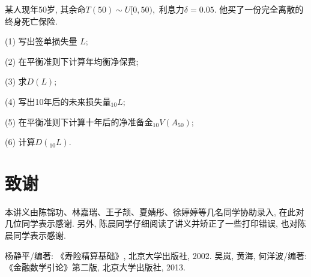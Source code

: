 \documentclass[a4paper,openany, 10pt]{ctexbook}
\newcommand{\hei}{\CJKfamily{hei}}      %
\begin{document}
\begin{exs}
  某人现年50岁, 其余命$T(50)\sim U[0,50),$ 利息力$\delta=0.05.$ 他买了一份完全离散的终身死亡保险.

  (1) 写出签单损失量 $L;$

  (2) 在平衡准则下计算年均衡净保费;

  (3) 求$D(L);$

  (4) 写出10年后的未来损失量$_{10}L;$

  (5) 在平衡准则下计算十年后的净准备金${}_{10}V( A_{50});$

  (6) 计算$D({}_{10}L).$
 
\end{exs}



\backmatter

\chapter{致谢}

本讲义由陈锦功、林嘉瑞、王子颉、夏婧彤、徐婷婷等几名同学协助录入, 在此对几位同学表示感谢. 另外, 陈晨同学仔细阅读了讲义并矫正了一些打印错误, 也对陈晨同学表示感谢.

\newpage
{}
\begin{thebibliography}{99}
    杨静平/编著: 《寿险精算基础》, 北京大学出版社, 2002.
     吴岚, 黄海, 何洋波/编著: 《金融数学引论》第二版, 北京大学出版社, 2013.

\end{thebibliography}



%
%
%
%
%
%
%
\end{document}

